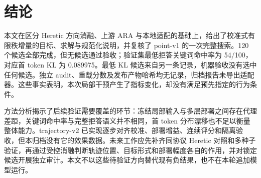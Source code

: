 \section{结论}
\label{sec:conclusion}

本文在区分 Heretic 方向消融、上游 ARA 与本地适配的基础上，给出了校准式有限秩增量的目标、求解与规范化说明，并复核了 point-v1 的一次完整搜索。120 个候选全部完成，但无候选通过验收；验证集最低拒答关键词命中率为 54/100，对应首 token KL 为 0.089975。最低 KL 候选来自另一条记录，机器验收没有选中任何候选。独立 audit、重载分数及发布产物哈希均无记录，归档报告未导出适配器。这些事实表明，本次局部干预产生了指标变化，却没有满足预先指定的行为条件。

方法分析揭示了后续验证需要覆盖的环节：冻结局部输入与多层部署之间存在代理差距，关键词命中率与完整拒答语义并不相同，首 token 分布漂移也不足以衡量整体能力。trajectory-v2 已实现逐步对齐校准、部署增益、连续评分和隔离验收，但本归档没有它的效果数据。未来工作应先补齐同协议 Heretic 对照和多种子验证，再通过受控消融判断轨迹位置、目标形式和部署幅度各自的作用，并对锁定候选开展独立审计。本文不以这些待验证方向替代现有负结果，也不在本轮追加模型运行。
